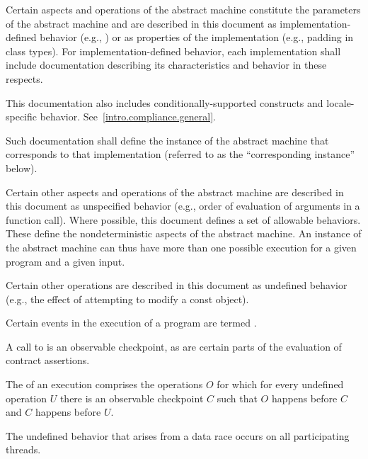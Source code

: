 \pnum
{}%
Certain aspects and operations of the abstract machine
constitute the parameters of the abstract machine and
are described in this
document as implementation-defined behavior (e.g., )
or as properties of the implementation (e.g., padding in class types).
For implementation-defined behavior,
each implementation shall include documentation describing its characteristics
and behavior in these respects.
\begin{footnote}
This documentation also includes
conditionally-supported constructs and locale-specific behavior.
See~\ref{intro.compliance.general}.
\end{footnote}
Such documentation shall define the instance of the
abstract machine that corresponds to that implementation (referred to as the
``corresponding instance'' below).

\pnum
{}%
Certain other aspects and operations of the abstract machine are
described in this document as unspecified behavior
(e.g., order of evaluation of arguments in a function call).
Where possible, this
document defines a set of allowable behaviors. These
define the nondeterministic aspects of the abstract machine. An instance
of the abstract machine can thus have more than one possible execution
for a given program and a given input.

\pnum
{}%
Certain other operations are described in this document as
undefined behavior (e.g., the effect of
attempting to modify a const object).

\pnum
Certain events in the execution of a program
are termed .
\begin{note}
A call to 
is an observable checkpoint,
as are certain parts of
the evaluation of contract assertions.
\end{note}

\pnum
{}%
%
The  of an execution
comprises the operations $O$
for which for every undefined operation $U$
there is an observable checkpoint $C$
such that $O$ happens before $C$ and
$C$ happens before $U$.

\begin{note}
The undefined behavior that arises from a data race
occurs on all participating threads.
\end{note}

